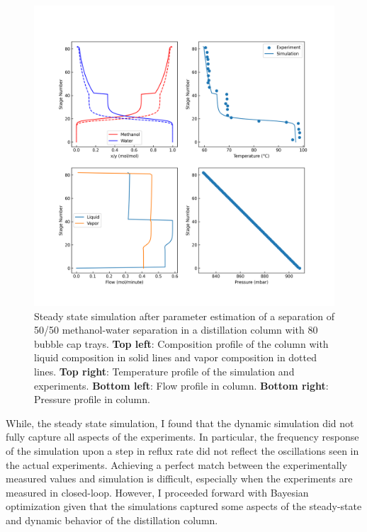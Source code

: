 \begin{figure}
    \centering
    \includegraphics[width=\textwidth]{gfx/Chapter06/2021_11_17_steady_state_estimated.png}
    \caption{Steady state simulation after parameter estimation of a separation of 50/50 methanol-water separation in a distillation column with 80 bubble cap trays. \textbf{Top left}: Composition profile of the column with liquid composition in solid lines and vapor composition in dotted lines. \textbf{Top right}: Temperature profile of the simulation and experiments. \textbf{Bottom left}: Flow profile in column. \textbf{Bottom right}: Pressure profile in column.}
    \label{fig:estimated}
\end{figure}

While, the steady state simulation, I found that the dynamic simulation did not fully capture all aspects of the experiments. In particular, the frequency response of the simulation upon a step in reflux rate did not reflect the oscillations seen in the actual experiments. Achieving a perfect match between the experimentally measured values and simulation is difficult, especially when the experiments are measured in closed-loop. However, I proceeded forward with Bayesian optimization given that the simulations captured some aspects of the steady-state and dynamic behavior of the distillation column.
 
